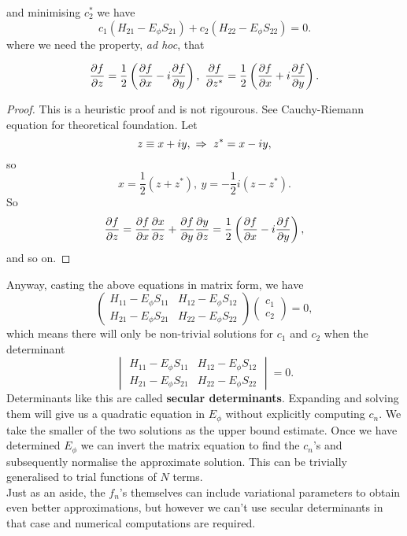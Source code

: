 and minimising $c_2^*$ we have
\begin{equation}
c_1(H_{21}-E_{\phi}S_{21})+c_2(H_{22}-E_{\phi}S_{22})=0.
\end{equation}
where we need the property, \textit{ad hoc}, that 
\begin{prt}
\begin{equation}
\diffp fz=\frac{1}{2}\lf(\diffp fx-i\diffp fy\rt),\ \diffp{f}{z^*}=\frac{1}{2}\lf(\diffp fx+i\diffp fy\rt).
\end{equation}
\end{prt}
\begin{proof}
This is a heuristic proof and is not rigourous. See Cauchy-Riemann equation for 
theoretical foundation. Let
\begin{equation}
z\equiv x+iy,\ \Rightarrow\ z^*=x-iy, 
\end{equation}
so
\begin{equation}
x=\frac{1}{2}(z+z^*),\ y=-\frac{1}{2}i(z-z^*).
\end{equation}
So
\begin{equation}
\diffp fz=\diffp fx\diffp xz+\diffp fy\diffp yz=\frac{1}{2}\lf(\diffp fx-i\diffp fy\rt),
\end{equation}
and so on. 
\end{proof}
Anyway, casting the above equations in matrix form, we have
\begin{equation}
\begin{pmatrix}
H_{11}-E_{\phi}S_{11}&H_{12}-E_{\phi}S_{12}\\
H_{21}-E_{\phi}S_{21}&H_{22}-E_{\phi}S_{22}
\end{pmatrix}
\begin{pmatrix}
c_1\\
c_2
\end{pmatrix}=0,
\end{equation}
which means there will only be non-trivial solutions for $c_1$ and $c_2$ when 
the determinant
\begin{equation}
\begin{vmatrix}
H_{11}-E_{\phi}S_{11}&H_{12}-E_{\phi}S_{12}\\
H_{21}-E_{\phi}S_{21}&H_{22}-E_{\phi}S_{22}
\end{vmatrix}=0. 
\end{equation}
Determinants like this are called \textbf{secular determinants}. 
Expanding and solving them will give us a quadratic equation in $E_{\phi}$ without 
explicitly computing $c_n$. We take the smaller of the two solutions as the upper 
bound estimate. Once we have determined $E_{\phi}$ we can invert the matrix 
equation to find the $c_n$'s and subsequently normalise the approximate solution. 
This can be trivially generalised to trial functions of $N$ terms. \\
Just as an aside, the $f_n$'s themselves can include variational parameters to 
obtain even better approximations, but however we can't use secular determinants 
in that case and numerical computations are required. 
